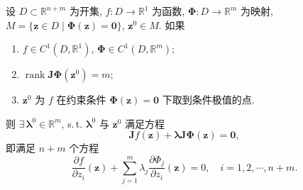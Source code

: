 \begin{theorem}\label{thm:9.3.1}
设 $D \subset \mathbb{R}^{n+m}$ 为开集, $f\colon D \to \mathbb{R}^{1}$ 为函数, $\boldsymbol{\Phi}\colon D \to \mathbb{R}^{m}$ 为映射, $M = \{\boldsymbol{z} \in D \mid \boldsymbol{\Phi}(\boldsymbol{z}) = \boldsymbol{0}\}$, $\boldsymbol{z}^{0} \in M$. 如果
\begin{enumerate}
  \item[(1$^{\circ}$)] $f \in C^{1}(D, \mathbb{R}^{1})$, $\boldsymbol{\Phi} \in C^{1}(D, \mathbb{R}^{m})$;
  \item[(2$^{\circ}$)] $\operatorname{rank}\boldsymbol{J}\boldsymbol{\Phi}(\boldsymbol{z}^{0}) = m$;
  \item[(3$^{\circ}$)] $\boldsymbol{z}^{0}$ 为 $f$ 在约束条件 $\boldsymbol{\Phi}(\boldsymbol{z}) = \boldsymbol{0}$ 下取到条件极值的点.
\end{enumerate}
则 $\exists\, \boldsymbol{\lambda}^{0} \in \mathbb{R}^{m}$, s.\,t. $\boldsymbol{\lambda}^{0}$ 与 $\boldsymbol{z}^{0}$ 满足方程
\[
  \boldsymbol{J}f(\boldsymbol{z}) + \boldsymbol{\lambda} \boldsymbol{J}\boldsymbol{\Phi}(\boldsymbol{z}) = \boldsymbol{0},
\]
即满足 $n+m$ 个方程
\[
  \frac{\partial f}{\partial z_{i}}(\boldsymbol{z}) + \sum_{j=1}^{m} \lambda_{j} \frac{\partial \Phi_{j}}{\partial z_{i}}(\boldsymbol{z}) = 0, \quad i = 1, 2, \cdots, n+m.
\]
\end{theorem}

